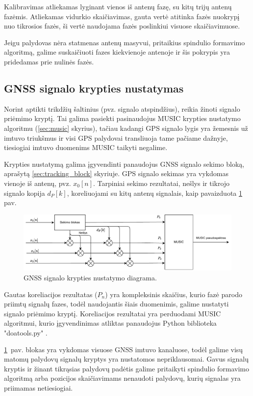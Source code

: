 \documentclass[main.tex]{subfiles}
\begin{document}
Kalibravimas atliekamas lyginant vienos iš antenų fazę, su kitų trijų antenų fazėmis.
Atliekamas vidurkio skaičiavimas, gauta vertė atitinka fazės nuokrypį nuo tikrosios
fazės, ši vertė naudojama fazės poslinkiui visuose skaičiavimuose.

Jeigu palydovas nėra statmenas antenų masyvui, pritaikius spindulio formavimo
algoritmą, galime suskaičiuoti fazes kiekvienoje antenoje ir šis pokrypis
yra pridedamas prie nulinės fazės.

\subsection{GNSS signalo krypties nustatymas}\label{sec:gnss_doa_block}

Norint aptikti trikdžių šaltinius (pvz. signalo atspindžius), reikia žinoti
signalo priėmimo kryptį. Tai galima pasiekti pasinaudojus MUSIC krypties nustatymo
algoritmu (\ref{sec:music} skyrius), tačiau kadangi GPS signalo lygis yra
žemesnis už imtuvo triukšmus
ir visi GPS palydovai transliuoja tame pačiame dažnyje,
tiesiogiai imtuvo duomenims MUSIC taikyti negalime.

Krypties nustatymą galima įgyvendinti panaudojus GNSS signalo sekimo bloką,
aprašytą \ref{sec:tracking_block} skyriuje. GPS signalo sekimas yra vykdomas
vienoje iš antenų, pvz. $x_0[n]$. Tarpiniai sekimo rezultatai, nešlys ir
tikrojo signalo kopija $d_P[k]$, koreliuojami su
kitų antenų signalais, kaip pavaizduota \ref{fig:gnss_sdr_tracking_block_doa}
pav.

\begin{figure}[h]
    \begin{centering}
    \includegraphics[scale=0.85]{drawings/tracking_diagram_doa}
    \par\end{centering}
    \protect\caption{\label{fig:gnss_sdr_tracking_block_doa}GNSS signalo krypties nustatymo diagrama.}
\end{figure}

Gautas koreliacijos rezultatas ($P_n$) yra kompleksinis skaičius, kurio
fazė parodo priimtų signalų fazes, todėl naudojantis
šiais duomenimis, galime nustatyti signalo priėmimo kryptį.
Koreliacijos rezultatai yra perduodami MUSIC algoritmui, kurio
įgyvendinimas atliktas panaudojus Python biblioteka "doatools.py" \cite{7738579}.

\ref{fig:gnss_sdr_tracking_block_doa}~pav. blokas yra vykdomas visuose
GNSS imtuvo kanaluose, todėl galime visų matomų palydovų signalų kryptys
yra nustatomos nepriklausomai. Gavus signalų kryptis ir žinant tikrąsias
palydovų padėtis galime pritaikyti spindulio formavimo algoritmą
arba pozicijos skaičiavimams nenaudoti palydovų, kurių signalas
yra priimamas netiesiogiai.
\end{document}
